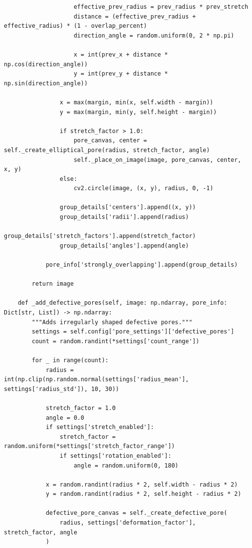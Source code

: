 \documentclass[code]{wordcore}
\begin{document}
\begin{code}
\begin{verbatim}
                    effective_prev_radius = prev_radius * prev_stretch
                    distance = (effective_prev_radius + effective_radius) * (1 - overlap_percent)
                    direction_angle = random.uniform(0, 2 * np.pi)

                    x = int(prev_x + distance * np.cos(direction_angle))
                    y = int(prev_y + distance * np.sin(direction_angle))

                x = max(margin, min(x, self.width - margin))
                y = max(margin, min(y, self.height - margin))

                if stretch_factor > 1.0:
                    pore_canvas, center = self._create_elliptical_pore(radius, stretch_factor, angle)
                    self._place_on_image(image, pore_canvas, center, x, y)
                else:
                    cv2.circle(image, (x, y), radius, 0, -1)
                
                group_details['centers'].append((x, y))
                group_details['radii'].append(radius)
                group_details['stretch_factors'].append(stretch_factor)
                group_details['angles'].append(angle)

            pore_info['strongly_overlapping'].append(group_details)

        return image

    def _add_defective_pores(self, image: np.ndarray, pore_info: Dict[str, List]) -> np.ndarray:
        """Adds irregularly shaped defective pores."""
        settings = self.config['pore_settings']['defective_pores']
        count = random.randint(*settings['count_range'])

        for _ in range(count):
            radius = int(np.clip(np.random.normal(settings['radius_mean'], settings['radius_std']), 10, 30))
            
            stretch_factor = 1.0
            angle = 0.0
            if settings['stretch_enabled']:
                stretch_factor = random.uniform(*settings['stretch_factor_range'])
                if settings['rotation_enabled']:
                    angle = random.uniform(0, 180)

            x = random.randint(radius * 2, self.width - radius * 2)
            y = random.randint(radius * 2, self.height - radius * 2)

            defective_pore_canvas = self._create_defective_pore(
                radius, settings['deformation_factor'], stretch_factor, angle
            )
            

\end{verbatim}
\end{code}
\end{document}
